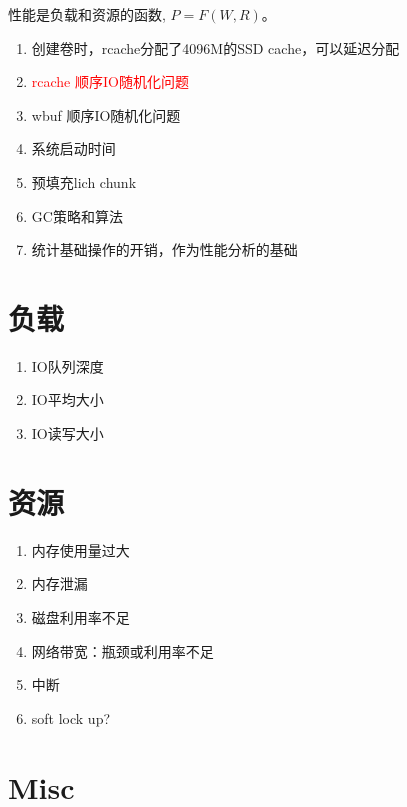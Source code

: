 性能是负载和资源的函数, $P=F(W, R)$。

\begin{tcolorbox}
\begin{enumerate}
    \item 创建卷时，rcache分配了4096M的SSD cache，可以延迟分配
    \item \textcolor{red}{rcache 顺序IO随机化问题}
    \item wbuf 顺序IO随机化问题
    \item 系统启动时间
    \item 预填充lich chunk
    \item GC策略和算法
    \item 统计基础操作的开销，作为性能分析的基础
\end{enumerate}
\end{tcolorbox}

\section{负载}

\begin{tcolorbox}
\begin{enumerate}
    \item IO队列深度
    \item IO平均大小
    \item IO读写大小
\end{enumerate}
\end{tcolorbox}

\section{资源}

\begin{tcolorbox}
\begin{enumerate}
    \item 内存使用量过大
    \item 内存泄漏
    \item 磁盘利用率不足
    \item 网络带宽：瓶颈或利用率不足
    \item 中断
    \item soft lock up?
\end{enumerate}
\end{tcolorbox}

\section{Misc}

